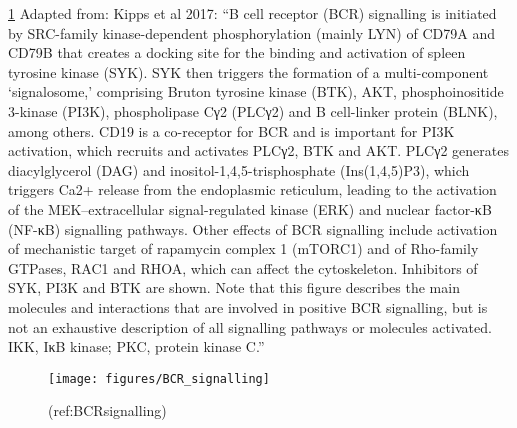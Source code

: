 \documentclass[11pt, a4paper, twosided]{book}
\begin{document}
\ref{fig:BCRsignalling} Adapted from: Kipps et al 2017: ``B cell receptor (BCR) signalling is initiated by SRC-family kinase-dependent phosphorylation (mainly LYN) of CD79A and CD79B that creates a docking site for the binding and activation of spleen tyrosine kinase (SYK). SYK then triggers the formation of a multi-component `signalosome,' comprising Bruton tyrosine kinase (BTK), AKT, phosphoinositide 3-kinase (PI3K), phospholipase Cγ2 (PLCγ2) and B cell-linker protein (BLNK), among others. CD19 is a co-receptor for BCR and is important for PI3K activation, which recruits and activates PLCγ2, BTK and AKT. PLCγ2 generates diacylglycerol (DAG) and inositol-1,4,5-trisphosphate (Ins(1,4,5)P3), which triggers Ca2+ release from the endoplasmic reticulum, leading to the activation of the MEK--extracellular signal-regulated kinase (ERK) and nuclear factor-κB (NF-κB) signalling pathways. Other effects of BCR signalling include activation of mechanistic target of rapamycin complex 1 (mTORC1) and of Rho-family GTPases, RAC1 and RHOA, which can affect the cytoskeleton. Inhibitors of SYK, PI3K and BTK are shown. Note that this figure describes the main molecules and interactions that are involved in positive BCR signalling, but is not an exhaustive description of all signalling pathways or molecules activated. IKK, IκB kinase; PKC, protein kinase C.''
\begin{figure}

{\centering \texttt{[image: figures/BCR\_signalling]} 

}

\caption{(ref:BCRsignalling)}\label{fig:BCRsignalling}
\end{figure}
\end{document}
